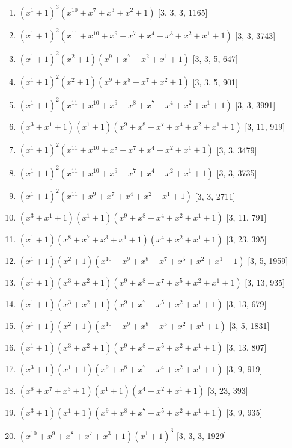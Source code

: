 \documentclass[10pt,twocolumn]{article}
\begin{document}
\begin{enumerate}
\item $(x^{1} + 1)^{3}(x^{10} + x^{7} + x^{3} + x^{2} + 1)$  [3, 3, 3, 1165]
\item $(x^{1} + 1)^{2}(x^{11} + x^{10} + x^{9} + x^{7} + x^{4} + x^{3} + x^{2} + x^{1} + 1)$  [3, 3, 3743]
\item $(x^{1} + 1)^{2}(x^{2} + 1)(x^{9} + x^{7} + x^{2} + x^{1} + 1)$  [3, 3, 5, 647]
\item $(x^{1} + 1)^{2}(x^{2} + 1)(x^{9} + x^{8} + x^{7} + x^{2} + 1)$  [3, 3, 5, 901]
\item $(x^{1} + 1)^{2}(x^{11} + x^{10} + x^{9} + x^{8} + x^{7} + x^{4} + x^{2} + x^{1} + 1)$  [3, 3, 3991]
\item $(x^{3} + x^{1} + 1)(x^{1} + 1)(x^{9} + x^{8} + x^{7} + x^{4} + x^{2} + x^{1} + 1)$  [3, 11, 919]
\item $(x^{1} + 1)^{2}(x^{11} + x^{10} + x^{8} + x^{7} + x^{4} + x^{2} + x^{1} + 1)$  [3, 3, 3479]
\item $(x^{1} + 1)^{2}(x^{11} + x^{10} + x^{9} + x^{7} + x^{4} + x^{2} + x^{1} + 1)$  [3, 3, 3735]
\item $(x^{1} + 1)^{2}(x^{11} + x^{9} + x^{7} + x^{4} + x^{2} + x^{1} + 1)$  [3, 3, 2711]
\item $(x^{3} + x^{1} + 1)(x^{1} + 1)(x^{9} + x^{8} + x^{4} + x^{2} + x^{1} + 1)$  [3, 11, 791]
\item $(x^{1} + 1)(x^{8} + x^{7} + x^{3} + x^{1} + 1)(x^{4} + x^{2} + x^{1} + 1)$  [3, 23, 395]
\item $(x^{1} + 1)(x^{2} + 1)(x^{10} + x^{9} + x^{8} + x^{7} + x^{5} + x^{2} + x^{1} + 1)$  [3, 5, 1959]
\item $(x^{1} + 1)(x^{3} + x^{2} + 1)(x^{9} + x^{8} + x^{7} + x^{5} + x^{2} + x^{1} + 1)$  [3, 13, 935]
\item $(x^{1} + 1)(x^{3} + x^{2} + 1)(x^{9} + x^{7} + x^{5} + x^{2} + x^{1} + 1)$  [3, 13, 679]
\item $(x^{1} + 1)(x^{2} + 1)(x^{10} + x^{9} + x^{8} + x^{5} + x^{2} + x^{1} + 1)$  [3, 5, 1831]
\item $(x^{1} + 1)(x^{3} + x^{2} + 1)(x^{9} + x^{8} + x^{5} + x^{2} + x^{1} + 1)$  [3, 13, 807]
\item $(x^{3} + 1)(x^{1} + 1)(x^{9} + x^{8} + x^{7} + x^{4} + x^{2} + x^{1} + 1)$  [3, 9, 919]
\item $(x^{8} + x^{7} + x^{3} + 1)(x^{1} + 1)(x^{4} + x^{2} + x^{1} + 1)$  [3, 23, 393]
\item $(x^{3} + 1)(x^{1} + 1)(x^{9} + x^{8} + x^{7} + x^{5} + x^{2} + x^{1} + 1)$  [3, 9, 935]
\item $(x^{10} + x^{9} + x^{8} + x^{7} + x^{3} + 1)(x^{1} + 1)^{3}$  [3, 3, 3, 1929]

\end{enumerate}
\end{document}
